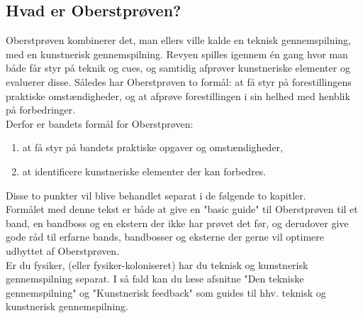 \subsection{Hvad er Oberstprøven?}
Oberstprøven kombinerer det, man ellers ville kalde en teknisk gennemspilning, med en kunstnerisk gennemspilning. Revyen spilles igennem én gang hvor man både får styr på teknik og cues, og samtidig afprøver kunstneriske elementer og evaluerer disse. Således har Oberstprøven to formål: at få styr på forestillingens praktiske omstændigheder, og at afprøve forestillingen i sin helhed med henblik på forbedringer.
\\
Derfor er bandets formål for Oberstprøven:
\begin{enumerate}
    \item at få styr på bandets praktiske opgaver og omstændigheder,
    \item at identificere kunstneriske elementer der kan forbedres.
\end{enumerate}

Disse to punkter vil blive behandlet separat i de følgende to kapitler.
\\
Formålet med denne tekst er både at give en "basic guide" til Oberstprøven til et band, en bandboss og en ekstern der ikke har prøvet det før, og derudover give gode råd til erfarne bands, bandbosser og eksterne der gerne vil optimere udbyttet af Oberstprøven.
\\
Er du fysiker, (eller fysiker-koloniseret) har du teknisk og kunstnerisk gennemspilning separat. I så fald kan du læse afsnitne "Den tekniske gennemspilning" og "Kunstnerisk feedback" som guides til hhv. teknisk og kunstnerisk gennemspilning.